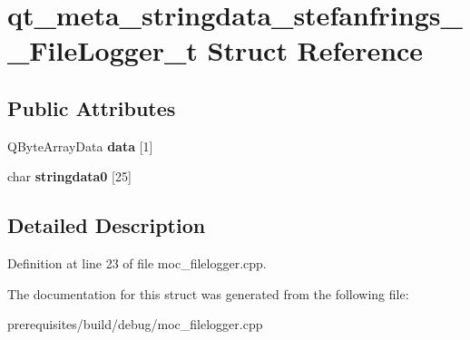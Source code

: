 \hypertarget{structqt__meta__stringdata__stefanfrings_____file_logger__t}{}\section{qt\+\_\+meta\+\_\+stringdata\+\_\+stefanfrings\+\_\+\+\_\+\+File\+Logger\+\_\+t Struct Reference}
\label{structqt__meta__stringdata__stefanfrings_____file_logger__t}
\subsection*{Public Attributes}
\begin{DoxyCompactItemize}
\item 
\mbox{\label{structqt__meta__stringdata__stefanfrings_____file_logger__t_a4e5d524426b535c7669cace103b836ab}} 
Q\+Byte\+Array\+Data {\bfseries data} \mbox{[}1\mbox{]}
\item 
\mbox{\label{structqt__meta__stringdata__stefanfrings_____file_logger__t_af3794d922ac03e53cad7fd4d271ec7c2}} 
char {\bfseries stringdata0} \mbox{[}25\mbox{]}
\end{DoxyCompactItemize}


\subsection{Detailed Description}


Definition at line 23 of file moc\+\_\+filelogger.\+cpp.



The documentation for this struct was generated from the following file\+:\begin{DoxyCompactItemize}
\item 
prerequisites/build/debug/moc\+\_\+filelogger.\+cpp\end{DoxyCompactItemize}
